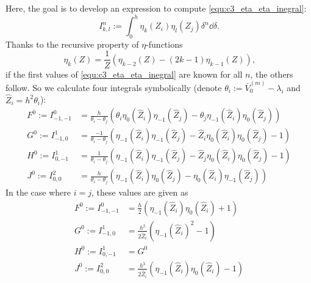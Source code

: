 Here, the goal is to develop an expression to compute \eqref{equ:c3_eta_eta_inegral}:
$$
  I_{k,l}^n := \int_0^h \eta_k(Z_i) \eta_l(Z_j) \delta^n \dd \delta\text{.}
$$
Thanks to the recursive property of $\eta$-functions
$$
  \eta_k(Z) = \frac{1}{Z}\left(\eta_{k-2}(Z) - (2k-1)\eta_{k-1}(Z)  \right)\text{,}
$$
if the first values of \eqref{equ:c3_eta_eta_inegral} are known for all $n$, the others follow. So we calculate four integrals symbolically (denote $\theta_i := \bar{V}_0^{(m)} -  \lambda_i$ and $\hat{Z}_i = h^2\theta_i$):
\begin{align*}
  F^0 := I_{-1,-1}^0 & = \frac{h}{\theta_i - \theta_j}\left(\theta_i \eta_0(\hat{Z}_i)\eta_{-1}(\hat{Z}_j) - \theta_j \eta_{-1}(\hat{Z}_i)\eta_0(\hat{Z}_j)\right)   \\
  G^0 := I_{-1, 0}^1 & = \frac{-1}{\theta_i - \theta_j}\left(\eta_{-1}(\hat{Z}_i)\eta_{-1}(\hat{Z}_j) - \hat{Z}_i \eta_{0}(\hat{Z}_i)\eta_{0}(\hat{Z}_j)  - 1\right) \\
  H^0 := I_{0, -1}^1 & = \frac{1}{\theta_i - \theta_j}\left(\eta_{-1}(\hat{Z}_i)\eta_{-1}(\hat{Z}_j) - \hat{Z}_j \eta_{0}(\hat{Z}_i)\eta_{0}(\hat{Z}_j)  - 1\right)  \\
  J^0 := I_{0,0}^{2} & = \frac{h}{\theta_i - \theta_j}\left(\eta_{-1}(\hat{Z}_i)\eta_{0}(\hat{Z}_j) - \eta_{0}(\hat{Z}_i)\eta_{-1}(\hat{Z}_j)\right)
\end{align*}
In the case where $i = j$, these values are given as
\begin{align*}
  F^0 := I_{-1,-1}^0 & = \frac{h}{2} \left(\eta_{-1}(\hat{Z}_i) \eta_{0}(\hat{Z}_i) + 1\right)             \\
  G^0 := I_{-1, 0}^1 & = \frac{h^2}{2 \hat{Z}_i} \left(\eta_{-1}(\hat{Z}_i)^2 - 1\right)                   \\
  H^0 := I_{0, -1}^1 & = G^0                                                                               \\
  J^0 := I_{0,0}^{2} & = \frac{h^3}{2 \hat{Z}_i} \left(\eta_{-1}(\hat{Z}_i) \eta_{0}(\hat{Z}_i) - 1\right)
\end{align*}


